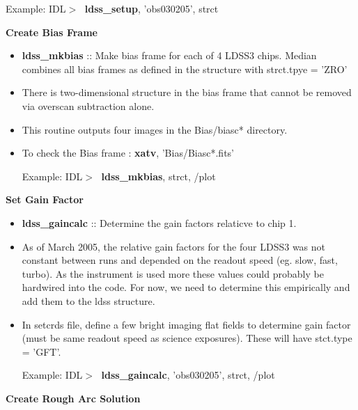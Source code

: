 \documentclass[11pt,letterpaper,dvips]{article}
\begin{document}
\begin{enumerate}
\begin{itemize}
         \quad Example: IDL$> \;$ {\bf ldss\_setup}, 'obs030205', strct \\  
   \end{itemize}

{\Large \bf Create Bias Frame }

	\begin{itemize}
	  \item {\bf ldss\_mkbias} :: Make bias frame for each of 4
	    LDSS3 chips. Median combines all bias frames as defined in
	    the structure with strct.tpye = 'ZRO'

	  \item There is two-dimensional structure in the bias frame
	    that cannot be removed via overscan subtraction alone.

	  \item  This routine outputs four images in the Bias/biasc* directory.  
	   
	  \item To check the Bias frame : {\bf xatv}, 'Bias/Biasc*.fits'

         \quad Example: IDL$> \;$ {\bf ldss\_mkbias}, strct, /plot \\

	\end{itemize}


{\Large \bf Set Gain Factor }
     \begin{itemize}
       \item {\bf ldss\_gaincalc} :: Determine the gain factors
	 relaticve to chip 1.
       \item As of March 2005, the relative gain factors for the four LDSS3
	 was not constant between runs and depended on the readout
	 speed (eg. slow, fast, turbo).  As the instrument is used
	 more these values could probably be hardwired into the code.
	 For now, we need to determine this empirically and add them
	 to the ldss structure.

       \item In setcrds file, define a few bright imaging flat fields to determine
	 gain factor (must be same readout speed as science exposures).  These will
	 have stct.type = 'GFT'. 

         \quad Example: IDL$> \;$ {\bf ldss\_gaincalc}, 'obs030205', strct, /plot \\

     \end{itemize}

{\Large \bf Create Rough Arc Solution }


\end{enumerate}
\end{document}
